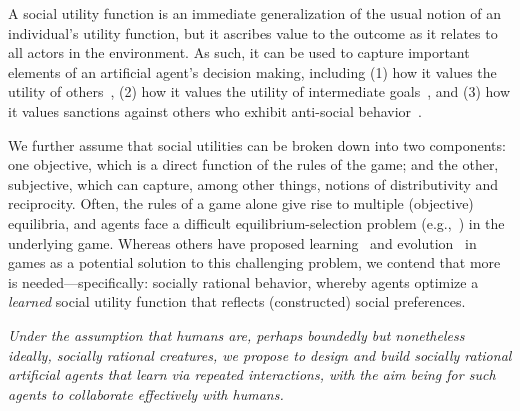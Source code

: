 A social utility function is an immediate generalization of the usual
notion of an individual's utility function, but it ascribes value to
the outcome as it relates to all actors in the environment.
%
%
As such, it can be used to capture important elements of an artificial
agent's decision making, including (1) how it values the utility of
others~\cite{littman01d}, (2) how it values the utility of
intermediate goals~\cite{macglashan15b}, and (3) how it values
sanctions against others who exhibit anti-social
behavior~\cite{macglashan14c}.

We further assume that social utilities can be broken down into two
components: one objective, which is a direct function of the rules of
the game; and the other, subjective, which can capture, among other
things, notions of distributivity and reciprocity.
%
Often, the rules of a game alone give rise to multiple (objective)
equilibria, and agents face a difficult equilibrium-selection problem
(e.g.,~\cite{schelling1980strategy}) in the underlying game.  
%
Whereas others have proposed learning~\cite{fud:levine} and
evolution~\cite{kmr:93} in games as a potential solution to this
challenging problem, we contend that more is needed---specifically:
socially rational behavior, whereby agents optimize a \emph{learned\/}
social utility function that reflects (constructed) social
preferences.


\emph{Under the assumption that humans are, perhaps boundedly but
  nonetheless ideally, socially rational creatures, we propose to
  design and build socially rational artificial agents that learn via
  repeated interactions, with the aim being for such agents to
  collaborate effectively with humans.}

